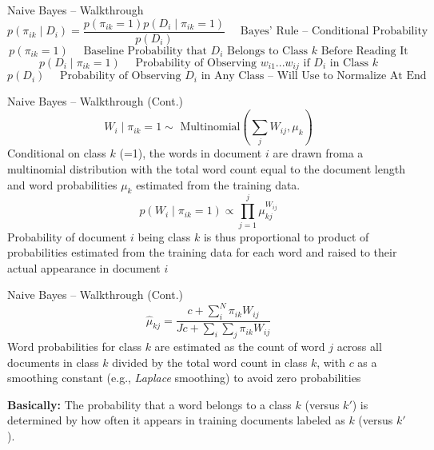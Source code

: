 \documentclass[
  ignorenonframetext,
  aspectratio=169]{beamer}
\begin{document}
\begin{frame}{Naive Bayes -- Walkthrough}
\label{naive-bayes-walkthrough}
\[p(\pi_{ik}\mid D_i) = \frac{p(\pi_{ik} = 1)p(D_i\mid \pi_{ik} =1)}{p(D_i)} \quad \text{ Bayes' Rule -- Conditional Probability} \]
\vspace{2.5mm}
\[p(\pi_{ik} = 1) \quad \text{ Baseline Probability that } D_i \text{ Belongs to Class } k \text{ Before Reading It} \]
\vspace{2.5mm}
\[p(D_i\mid \pi_{ik} = 1) \quad \text{ Probability of Observing } w_{i1}...w_{ij} \text{ if } D_i \text{ in Class } k\]
\vspace{2.5mm}
\[p(D_i) \quad \text{ Probability of Observing } D_i \text{ in Any Class -- Will Use to Normalize At End}\]
\vspace{2.5mm}
\end{frame}

\begin{frame}{Naive Bayes -- Walkthrough (Cont.)}
\label{naive-bayes-walkthrough-cont.}
\[W_i\mid \pi_{ik} = 1 \sim \text{ Multinomial}(\sum_jW_{ij},\mu_k)\]
Conditional on class \(k\) (=1), the words in document \(i\) are drawn
froma a multinomial distribution with the total word count equal to the
document length and word probabilities \(\mu_{k}\) estimated from the
training data. \vspace{2.5mm}
\[p(W_i\mid \pi_{ik} = 1) \propto \prod^j_{j=1}\mu_{kj}^{W_{ij}} \]
Probability of document \(i\) being class \(k\) is thus proportional to
product of probabilities estimated from the training data for each word
and raised to their actual appearance in document \(i\) \vspace{2.5mm}
\end{frame}

\begin{frame}{Naive Bayes -- Walkthrough (Cont.)}
\label{naive-bayes-walkthrough-cont.-1}
\[\hat{\mu}_{kj} = \frac{c + \sum^N_i \pi_{ik}W_{ij}}{Jc + \sum_i \sum_j \pi_{ik}W_{ij}}\]
Word probabilities for class \(k\) are estimated as the count of word
\(j\) across all documents in class \(k\) divided by the total word
count in class \(k\), with \(c\) as a smoothing constant (e.g.,
\textit{Laplace} smoothing) to avoid zero probabilities \vspace{2.5mm}

\textbf{Basically:} The probability that a word belongs to a class \(k\)
(versus \(k'\)) is determined by how often it appears in training
documents labeled as \(k\) (versus \(k'\)).
\end{frame}
\end{document}
